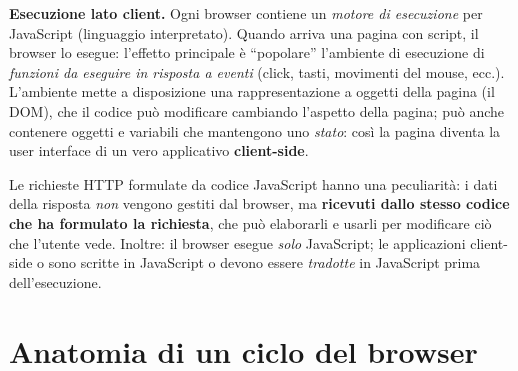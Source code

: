 \textbf{Esecuzione lato client.} Ogni browser contiene un \emph{motore di esecuzione} per
JavaScript (linguaggio interpretato). Quando arriva una pagina con script, il browser lo
esegue: l'effetto principale \`e ``popolare'' l'ambiente di esecuzione di \emph{funzioni da
eseguire in risposta a eventi} (click, tasti, movimenti del mouse, ecc.). L'ambiente mette a
disposizione una rappresentazione a oggetti della pagina (il DOM), che il codice pu\`o
modificare cambiando l'aspetto della pagina; pu\`o anche contenere oggetti e variabili che
mantengono uno \emph{stato}: cos\`i la pagina diventa la user interface di un vero applicativo
\textbf{client-side}.

\begin{importante}
Le richieste HTTP formulate da codice JavaScript hanno una peculiarit\`a: i dati della
risposta \emph{non} vengono gestiti dal browser, ma \textbf{ricevuti dallo stesso codice che
ha formulato la richiesta}, che pu\`o elaborarli e usarli per modificare ci\`o che l'utente
vede. Inoltre: il browser esegue \emph{solo} JavaScript; le applicazioni client-side o sono
scritte in JavaScript o devono essere \emph{tradotte} in JavaScript prima dell'esecuzione.
\end{importante}

\section{Anatomia di un ciclo del browser}

